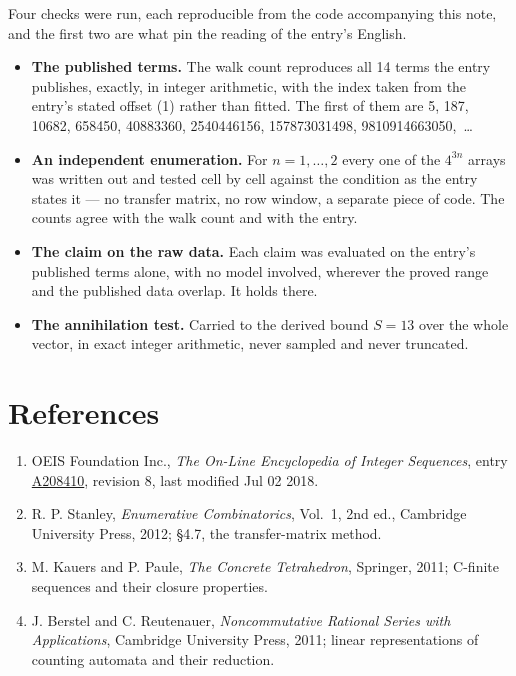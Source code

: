 \documentclass[11pt]{article}
\theoremstyle{definition}
\begin{document}
Four checks were run, each reproducible from the code accompanying this note, and the first two are what pin the reading of the entry's English.

\begin{itemize}

\item {\bfseries The published terms.} The walk count reproduces all 14 terms the entry publishes, exactly, in integer arithmetic, with the index taken from the entry's stated offset (1) rather than fitted. The first of them are 5, 187, 10682, 658450, 40883360, 2540446156, 157873031498, 9810914663050,~\dots

\item {\bfseries An independent enumeration.} For $n = 1,\dots,2$ every one of the $4^{3n}$ arrays was written out and tested cell by cell against the condition as the entry states it --- no transfer matrix, no row window, a separate piece of code. The counts agree with the walk count and with the entry.

\item {\bfseries The claim on the raw data.} Each claim was evaluated on the entry's published terms alone, with no model involved, wherever the proved range and the published data overlap. It holds there.

\item {\bfseries The annihilation test.} Carried to the derived bound $S = 13$ over the whole vector, in exact integer arithmetic, never sampled and never truncated.

\end{itemize}

\section{References}

\begin{enumerate}

\item OEIS Foundation Inc., \emph{The On-Line Encyclopedia of Integer Sequences}, entry \href{https://oeis.org/A208410}{A208410}, revision 8, last modified Jul 02 2018.

\item R. P. Stanley, \emph{Enumerative Combinatorics}, Vol.~1, 2nd ed., Cambridge University Press, 2012; \S4.7, the transfer-matrix method.

\item M. Kauers and P. Paule, \emph{The Concrete Tetrahedron}, Springer, 2011; C-finite sequences and their closure properties.

\item J. Berstel and C. Reutenauer, \emph{Noncommutative Rational Series with Applications}, Cambridge University Press, 2011; linear representations of counting automata and their reduction.

\end{enumerate}
\end{document}
